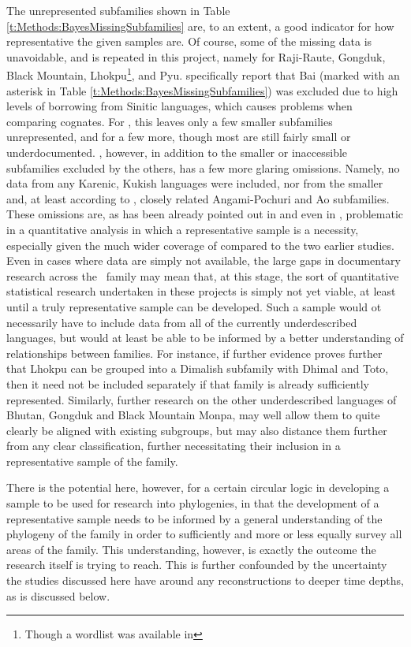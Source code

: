 The unrepresented subfamilies shown in Table \ref{t:Methods:BayesMissingSubfamilies} are, to an extent, a good indicator for how representative the given samples are. Of course, some of the missing data is unavoidable, and is repeated in this project, namely for Raji-Raute, Gongduk, Black Mountain, Lhokpu\footnote{Though a wordlist was available in }, and Pyu.  specifically report that Bai (marked with an asterisk in Table \ref{t:Methods:BayesMissingSubfamilies}) was excluded due to high levels of borrowing from Sinitic languages, which causes problems when comparing cognates. For , this leaves only a few smaller subfamilies unrepresented, and for  a few more, though most are still fairly small or underdocumented. , however, in addition to the smaller or inaccessible subfamilies excluded by the others, has a few more glaring omissions. Namely, no data from any Karenic, Kukish languages were included, nor from the smaller and, at least according to , closely related Angami-Pochuri and Ao subfamilies. These omissions are, as has been already pointed out in  and even in , problematic in a quantitative analysis in which a representative sample is a necessity, especially given the much wider coverage of  compared to the two earlier studies. Even in cases where data are simply not available, the large gaps in documentary research across the \lfam\ family may mean that, at this stage, the sort of quantitative statistical research undertaken in these projects is simply not yet viable, at least until a truly representative sample can be developed. Such a sample would ot necessarily have to include data from all of the currently underdescribed languages, but would at least be able to be informed by a better understanding of relationships between families. For instance, if further evidence proves further that Lhokpu can be grouped into a Dimalish subfamily with Dhimal and Toto, then it need not be included separately if that family is already sufficiently represented. Similarly, further research on the other underdescribed languages of Bhutan, Gongduk and Black Mountain Monpa, may well allow them to quite clearly be aligned with existing subgroups, but may also distance them further from any clear classification, further necessitating their inclusion in a representative sample of the family.

There is the potential here, however, for a certain circular logic in developing a sample to be used for research into phylogenies, in that the development of a representative sample needs to be informed by a general understanding of the phylogeny of the family in order to sufficiently and more or less equally survey all areas of the family. This understanding, however, is exactly the outcome the research itself is trying to reach. This is further confounded by the uncertainty the studies discussed here have around any reconstructions to deeper time depths, as is discussed below.

